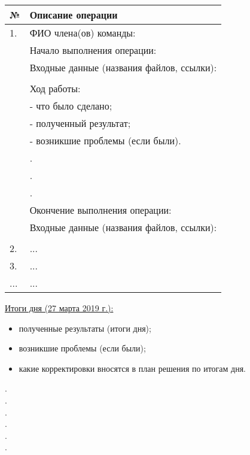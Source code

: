 \begin{center}
    \begin{longtable}{|l|l|}
        \hline
        № & Описание операции \\
        \hline
        1. & ФИО члена(ов) команды: \underline{\hspace{6cm}} \\
           & Начало выполнения операции: \underline{\hspace{5cm}} \\
           & Входные данные (названия файлов, ссылки): \underline{\hspace{6cm}}\\
           & \underline{\hspace{14cm}}\\
           & Ход работы: \\
           & - что было сделано; \\
           & - полученный результат; \\
           & - возникшие проблемы (если были).\\
           & . \\
           & . \\
           & . \\
           & Окончение выполнения операции: \underline {\hspace{6cm}}\\
           & Входные данные (названия файлов, ссылки): \underline{\hspace{6cm}} \\
           & \underline{\hspace{14cm}}\\
        \hline
        2. & ... \\
        \hline
        3. & ... \\
        \hline
        ... & ... \\
        \hline
    \end{longtable}
\end{center}

\noindent\underline{Итоги дня (27 марта 2019 г.):}\\
\begin{itemize}
    \item полученные результаты (итоги дня);
    \item возникшие проблемы (если были);
    \item какие корректировки вносятся в план решения по итогам дня.
\end{itemize}

\noindent\underline{\hspace{9cm}}.\\
\underline{\hspace{9cm}}.\\
\underline{\hspace{9cm}}.\\
\underline{\hspace{9cm}}.\\
\underline{\hspace{9cm}}.\\
\underline{\hspace{9cm}}.